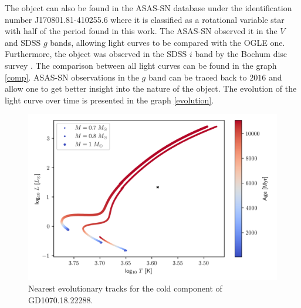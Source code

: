 \documentclass{pracalicmgr}
\begin{document}
The object can also be found in the ASAS-SN database \citep{jayasinghe_asas-sn_2019} under the identification number J170801.81-410255.6 where it is classified
as a rotational variable star with half of the period found in this work. The ASAS-SN observed it in the $V$ and SDSS $g$ bands, allowing light curves to be compared with the OGLE one.
Furthermore, the object was observed in the SDSS $i$ band by the Bochum disc survey \citep{hackstein_bochum_2015}. The comparison between all light curves can be found in the graph \ref{comp}.
ASAS-SN observations in the $g$ band can be traced back to $2016$ and allow one to get better insight into the nature of the object.
The evolution of the light curve over time is presented in the graph \ref{evolution}.

\begin{figure}%
    \includegraphics[scale=1]{plots/GD1070.18.22288_HR.png}
    \caption{Nearest evolutionary tracks for the cold component of GD1070.18.22288.}
    \label{HR_cold}
\end{figure}
\end{document}
